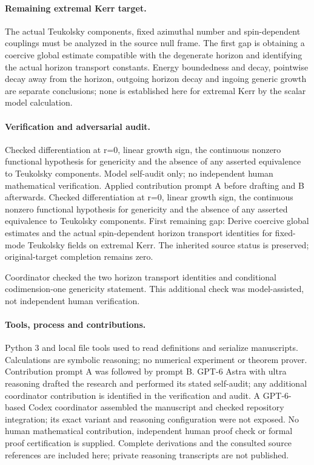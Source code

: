 \documentclass[11pt]{article}
\begin{document}
\paragraph{Remaining extremal Kerr target.} The actual Teukolsky components, fixed azimuthal number and spin-dependent couplings must be analyzed in the source null frame. The first gap is obtaining a coercive global estimate compatible with the degenerate horizon and identifying the actual horizon transport constants. Energy boundedness and decay, pointwise decay away from the horizon, outgoing horizon decay and ingoing generic growth are separate conclusions; none is established here for extremal Kerr by the scalar model calculation.

\paragraph{Verification and adversarial audit.}
Checked differentiation at r=0, linear growth sign, the continuous nonzero functional hypothesis for genericity and the absence of any asserted equivalence to Teukolsky components. Model self-audit only; no independent human mathematical verification. Applied contribution prompt A before drafting and B afterwards. Checked differentiation at r=0, linear growth sign, the continuous nonzero functional hypothesis for genericity and the absence of any asserted equivalence to Teukolsky components. First remaining gap: Derive coercive global estimates and the actual spin-dependent horizon transport identities for fixed-mode Teukolsky fields on extremal Kerr. The inherited source status is preserved; original-target completion remains zero.

Coordinator checked the two horizon transport identities and conditional codimension-one genericity statement. This additional check was model-assisted, not independent human verification.

\paragraph{Tools, process and contributions.}
Python 3 and local file tools used to read definitions and serialize manuscripts. Calculations are symbolic reasoning; no numerical experiment or theorem prover. Contribution prompt A was followed by prompt B. GPT-6 Astra with ultra reasoning drafted the research and performed its stated self-audit; any additional coordinator contribution is identified in the verification and audit. A GPT-6-based Codex coordinator assembled the manuscript and checked repository integration; its exact variant and reasoning configuration were not exposed. No human mathematical contribution, independent human proof check or formal proof certification is supplied. Complete derivations and the consulted source references are included here; private reasoning transcripts are not published.
\end{document}
